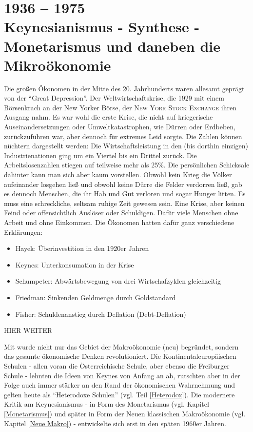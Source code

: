 %
%
%


\part{1936 -- 1975\\Keynesianismus - Synthese - Monetarismus und daneben die Mikroökonomie}

Die großen Ökonomen in der Mitte des 20. Jahrhunderts waren allesamt geprägt von der "`Great Depression"'. Der Weltwirtschaftskrise, die 1929 mit einem Börsenkrach an der New Yorker Börse, der \textsc{New York Stock Exchange} ihren Ausgang nahm. Es war wohl die erste Krise, die nicht auf kriegerische Auseinandersetzungen oder Umweltkatastrophen, wie Dürren oder Erdbeben, zurückzuführen war, aber dennoch für extremes Leid sorgte. Die Zahlen können nüchtern dargestellt werden: Die Wirtschaftsleistung in den (bis dorthin einzigen) Industrienationen ging um ein Viertel bis ein Drittel zurück. Die Arbeitslosenzahlen stiegen auf teilweise mehr als 25\%. Die persönlichen Schicksale dahinter kann man sich aber kaum vorstellen. Obwohl kein Krieg die Völker aufeinander losgehen ließ und obwohl keine Dürre die Felder verdorren ließ, gab es dennoch Menschen, die ihr Hab und Gut verloren und sogar Hunger litten. Es muss eine schreckliche, seltsam ruhige Zeit gewesen sein. Eine Krise, aber keinen Feind oder offensichtlich Auslöser oder Schuldigen. Dafür viele Menschen ohne Arbeit und ohne Einkommen.
Die Ökonomen hatten dafür ganz verschiedene Erklärungen:
\begin{itemize}
	\item Hayek: Überinvestition in den 1920er Jahren
	\item Keynes: Unterkonsumation in der Krise
	\item Schumpeter: Abwärtsbewegung von drei Wirtschafzyklen gleichzeitig
	\item Friedman: Sinkenden Geldmenge durch Goldstandard
	\item Fisher: Schuldenanstieg durch Deflation (Debt-Deflation)
\end{itemize}

HIER WEITER


Mit \textcite{Keynes1936} wurde nicht nur das Gebiet der Makroökonomie (neu) begründet, sondern das gesamte ökonomische Denken revolutioniert. Die Kontinentaleuropäischen Schulen - allen voran die Österreichische Schule, aber ebenso die Freiburger Schule - lehnten die Ideen von Keynes von Anfang an ab, rutschten aber in der Folge auch immer stärker an den Rand der ökonomischen Wahrnehmung und gelten heute als "`Heterodoxe Schulen"' (vgl. Teil \ref{Heterodox}). Die modernere Kritik am Keynesianismus - in Form des Monetarismus (vgl. Kapitel \ref{Monetarismus}) und später in Form der Neuen klassischen Makroökonomie (vgl. Kapitel \ref{Neue Makro}) - entwickelte sich erst in den späten 1960er Jahren. 

